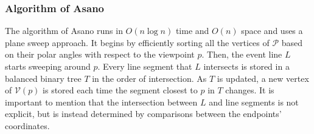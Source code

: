 \subsubsection{Algorithm of Asano \cite{asano1985efficient}}
The algorithm of Asano \cite{asano1985efficient} runs in $O(n \log n)$ time and $O(n)$ space and uses a plane sweep approach. It begins by efficiently sorting all the vertices of $\mathcal P$ based on their polar angles with respect to the viewpoint $p$. Then, the event line $L$ starts sweeping around $p$. Every line segment that $L$ intersects is stored in a balanced binary tree $T$ in the order of intersection. As $T$ is updated, a new vertex of $\mathcal V(p)$ is stored each time the segment closest to $p$ in $T$ changes. It is important to mention that the intersection between $L$ and line segments is not explicit, but is instead determined by comparisons between the endpoints' coordinates.

